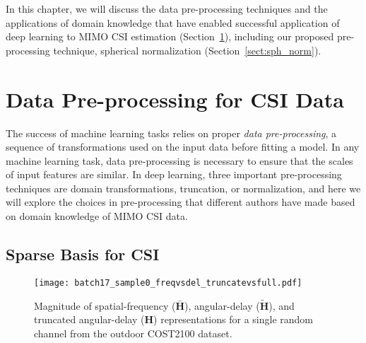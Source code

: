 
In this chapter, we will discuss the data pre-processing techniques and the applications of domain knowledge that have enabled successful application of deep learning to MIMO CSI estimation (Section~\ref{sec:data-preprocessing}), including our proposed pre-processing technique, spherical normalization (Section~\ref{sect:sph_norm}). 


\section{Data Pre-processing for CSI Data} \label{sec:data-preprocessing}

The success of machine learning tasks relies on proper \emph{data pre-processing}, a sequence of transformations used on the input data before fitting a model. In any machine learning task, data pre-processing is necessary to ensure that the scales of input features are similar. In deep learning, three important pre-processing techniques are domain transformations, truncation, or normalization, and here we will explore the choices in pre-processing that different authors have made based on domain knowledge of MIMO CSI data.

\subsection{Sparse Basis for CSI}

\begin{figure}[htb]
	\centering
	\texttt{[image: batch17\_sample0\_freqvsdel\_truncatevsfull.pdf]}
	\medskip
	\caption{Magnitude of spatial-frequency ($\bar{\mathbf H}$), angular-delay ($\tilde{\mathbf H}$), and truncated angular-delay ($\mathbf H$) representations for a single random channel from the outdoor COST2100 dataset.}
	\label{fig:freq-vs-delay}
\end{figure}

